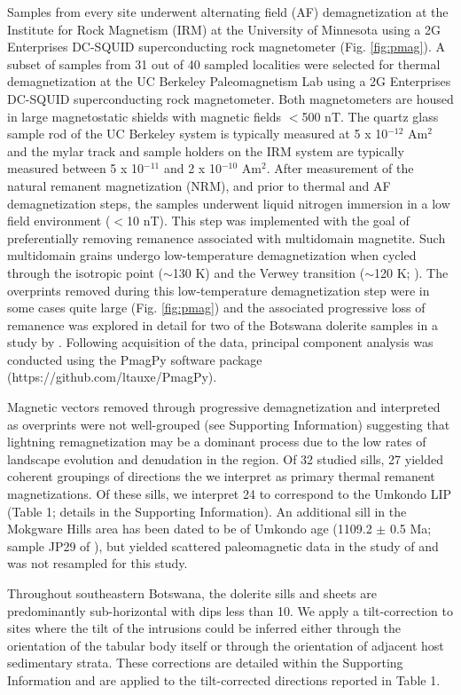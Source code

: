 \documentclass[11pt,letterpaper]{article}
\begin{document}
Samples from every site underwent alternating field (AF) demagnetization at the Institute for Rock Magnetism (IRM) at the University of Minnesota using a 2G Enterprises DC-SQUID superconducting rock magnetometer (Fig. \ref{fig:pmag}). A subset of samples from 31 out of 40 sampled localities were selected for thermal demagnetization at the UC Berkeley Paleomagnetism Lab using a 2G Enterprises DC-SQUID superconducting rock magnetometer. Both magnetometers are housed in large magnetostatic shields with magnetic fields $<$500 nT. The quartz glass sample rod of the UC Berkeley system is typically measured at 5 x 10$^{-12}$ Am$^2$ and the mylar track and sample holders on the IRM system are typically measured between 5 x 10$^{-11}$ and 2 x 10$^{-10}$ Am$^2$. After measurement of the natural remanent magnetization (NRM), and prior to thermal and AF demagnetization steps, the samples underwent liquid nitrogen immersion in a low field environment ($<$10 nT). This step was implemented with the goal of preferentially removing remanence associated with multidomain magnetite. Such multidomain grains undergo low-temperature demagnetization when cycled through the isotropic point ($\sim$130 K) and the Verwey transition ($\sim$120 K; \cite{Verwey1939a, Feinberg2015a}). The overprints removed during this low-temperature demagnetization step were in some cases quite large (Fig. \ref{fig:pmag}) and the associated progressive loss of remanence was explored in detail for two of the Botswana dolerite samples in a study by \cite{Feinberg2015a}. Following acquisition of the data, principal component analysis \citep{Kirschvink1980a} was conducted using the PmagPy software package (https://github.com/ltauxe/PmagPy).

Magnetic vectors removed through progressive demagnetization and interpreted as overprints were not well-grouped (see Supporting Information) suggesting that lightning remagnetization may be a dominant process due to the low rates of landscape evolution and denudation in the region. Of 32 studied sills, 27 yielded coherent groupings of directions the we interpret as primary thermal remanent magnetizations. Of these sills, we interpret 24 to correspond to the Umkondo LIP (Table 1; details in the Supporting Information). An additional sill in the Mokgware Hills area has been dated to be of Umkondo age (1109.2 $\pm$ 0.5 Ma; sample JP29 of \cite{Hanson2004a}), but yielded scattered paleomagnetic data in the study of \cite{Pancake2001a} and was not resampled for this study.

Throughout southeastern Botswana, the dolerite sills and sheets are predominantly sub-horizontal with dips less than 10\textdegree. We apply a tilt-correction to sites where the tilt of the intrusions could be inferred either through the orientation of the tabular body itself or through the orientation of adjacent host sedimentary strata. These corrections are detailed within the Supporting Information and are applied to the tilt-corrected directions reported in Table 1.
\end{document}
